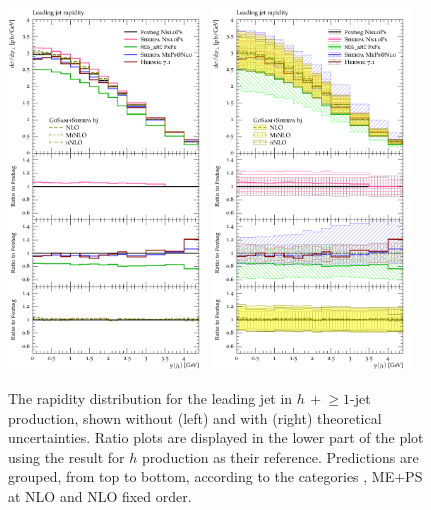\begin{figure}[t!]
  \centering
  \includegraphics[width=0.47\textwidth]{figures/hjetscomp_u_jet1_y.pdf}
  \hfill
  \includegraphics[width=0.47\textwidth]{figures/hjetscomp_jet1_y.pdf}
  \caption{\label{fig:hjetscomp:results:1obs:j1y}%
    The rapidity distribution for the leading jet in $h\,+\!\ge\!\!1$-jet
    production, shown without (left) and with (right) theoretical
    uncertainties. Ratio plots are displayed in the lower part of the
    plot using the \Powheg \NNLOPS result for $h$ production as their
    reference. Predictions are grouped, from top to bottom, according
    to the categories \NNLOPS, ME+PS at NLO and NLO fixed order.}
\end{figure}

